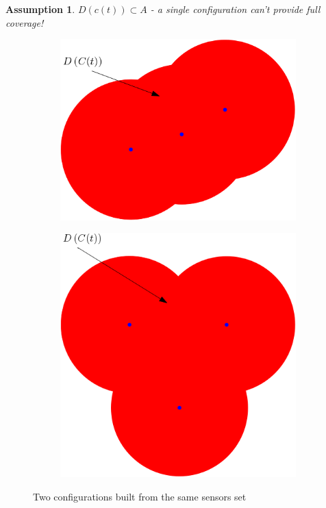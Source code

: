 \documentclass{iacas}
\newtheorem{assumption}{Assumption}
\begin{document}
\begin{assumption}
$D\left( c\left( t \right) \right) \subset A$ - a single configuration \emph{can't} provide full coverage!
\end{assumption}

\begin{figure}[H]
\centering
	\begin{subfigure}[b]{0.3\textwidth}
		\includegraphics[width=\textwidth]{figures/problem-def/config-1.png}
	\end{subfigure}
	\hspace{0.75cm}
	\vline
	\hspace{0.75cm}
	\begin{subfigure}[b]{0.3\textwidth}
		\includegraphics[width=\textwidth]{figures/problem-def/config-2.png}
	\end{subfigure}
	\caption{Two configurations built from the same sensors set}
\end{figure}
\end{document}
